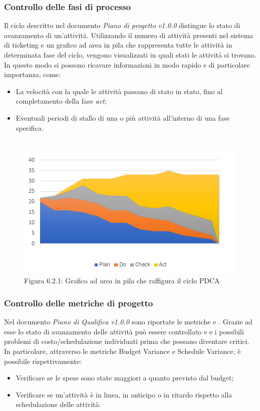 \subsubsection{Controllo delle fasi di processo}
Il ciclo  descritto nel documento \emph{Piano di progetto v1.0.0} distingue lo stato di avanzamento di un'attività. Utilizzando il numero di attività presenti nel sistema di ticketing e un grafico ad area in pila che rappresenta tutte le attività in determinata fase del ciclo, vengono visualizzati in quali stati le attività si trovano. \\
In questo modo si possono ricavare informazioni in  modo rapido e di particolare importanza, come:
\begin{itemize}
\item{La velocità con la quale le attività passano di stato in stato, fino al completamento della fase \emph{act};}
\item{Eventuali periodi di stallo di una o più attività all'interno di una fase specifica.} \\ \\
\end{itemize}  
\begin{figure} [H]
	\centering
	\includegraphics[scale=1]{../PianoDiProgetto/Img/Grafico_PDCA.png}
	\caption{Figura 6.2.1: Grafico ad area in pila che raffigura il ciclo PDCA}\label{}
\end{figure} 
\subsubsection{Controllo delle metriche di progetto}
Nel documento \emph{Piano di Qualifica v1.0.0} sono riportate le metriche  e . Grazie ad esse lo stato di avanzamento delle attività può essere controllato e  e i possibili problemi di costo/schedulazione individuati prima che possano diventare critici. In particolare, attraverso le metriche Budget Variance e Schedule Variance, è possibile rispettivamente:
\begin{itemize}
\item{Verificare se le spese sono state maggiori a quanto previsto dal budget;}
\item{Verificare se un'attività è in linea, in anticipo o in ritardo rispetto alla schedulazione delle attività.}
\end{itemize}

